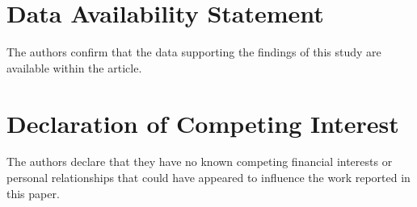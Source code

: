 \documentclass[preprint,12pt]{elsarticle}
\begin{document}
\section*{Data Availability Statement}
The authors confirm that the data supporting the findings of this study are available within the article.

\section*{Declaration of Competing Interest}
The authors declare that they have no known competing financial interests or personal relationships that could have appeared to influence the work reported in this paper.



\end{document}
